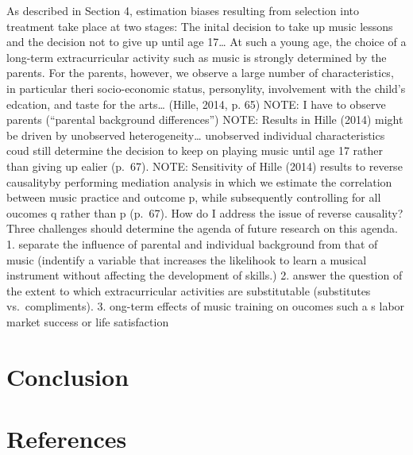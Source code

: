 \documentclass[a4, 12pt]{article}
\begin{document}
\label{sec:results}

As described in Section 4, estimation biases resulting from selection into treatment take place at two stages: The inital decision to take up music lessons and the decision not to give up until age 17\ldots{} At such a young age, the choice of a long-term extracurricular activity such as music is strongly determined by the parents. For the parents, however, we observe a large number of characteristics, in particular theri socio-economic status, personylity, involvement with the child's edcation, and taste for the arts\ldots{} (Hille, 2014, p. 65)
NOTE: I have to observe parents (``parental background differences'')
NOTE: Results in Hille (2014) might be driven by unobserved heterogeneity\ldots{} unobserved individual characteristics coud still determine the decision to keep on playing music until age 17 rather than giving up ealier (p.~67).
NOTE: Sensitivity of Hille (2014) results to reverse causalityby performing mediation analysis in which we estimate the correlation between music practice and outcome p, while subsequently controlling for all oucomes q rather than p (p.~67). How do I address the issue of reverse causality?
Three challenges should determine the agenda of future research on this agenda.
1. separate the influence of parental and individual background from that of music (indentify a variable that increases the likelihook to learn a musical instrument without affecting the development of skills.)
2. answer the question of the extent to which extracurricular activities are substitutable (substitutes vs.~compliments).
3. ong-term effects of music training on oucomes such a s labor market success or life satisfaction

\clearpage

\hypertarget{conclusion}{%
\section{Conclusion}\label{conclusion}}

\label{sec:conclusion}

\clearpage

\hypertarget{references}{%
\section*{References}\label{references}}

\singlespacing

\setlength{\parindent}{-0.5in}
\setlength{\leftskip}{0.5in}
\setlength{\parskip}{8pt}
\end{document}
